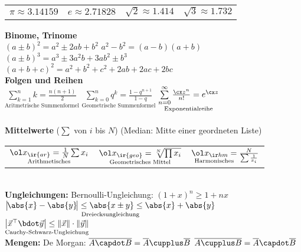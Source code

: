 \documentclass[english]{latex4ei_sheet}
\begin{document}
\begin{sectionbox}
	\begin{tabular}{@{}llll}
		$\pi \approx \num{3,14159}$ & $e \approx \num{2,71828}$ & $\sqrt{2} \approx \num{1,414}$ & $\sqrt{3} \approx \num{1,732}$ \\
	\end{tabular}
	
	\textbf{Binome, Trinome}\\
	$(a\pm b)^2 = a^2 \pm 2ab + b^2$ \hfill $a^2 - b^2 = (a-b)(a+b)$\\
	$(a \pm b)^3 = a^3 \pm 3a^2b + 3ab^2 \pm b^3$\\
	$(a+b+c)^2 = a^2 + b^2 + c^2 + 2ab + 2ac + 2bc$
	\\[0.5em]
	\textbf{Folgen und Reihen}\\
	$\underset{\text{Aritmetrische Summenformel}}{\sum \limits_{k=1}^{n} k = \frac{n (n+1)}{2}}$ \quad $\underset{\text{Geometrische Summenformel}}{\sum \limits_{k=0}^{n} q^k = \frac{1 - q^{n+1}}{1-q}}$ \quad $\underset{\text{Exponentialreihe}}{\sum\limits_{n = 0}^{\infty} \frac{\cx z^n}{n!} = e^{\cx z}}$\\
	\\[0.5em]
	\textbf{Mittelwerte} \quad ($\sum$ von $i$ bis $N$) \hfill {\small (Median: Mitte einer geordneten Liste)}\\
	\begin{tabular*}{\columnwidth}{@{\extracolsep\fill}l@{\quad\ $\ge$}l@{\quad\ $\ge$}l}
		$\underset{\text{Arithmetisches}}{\ol x_{\ir{ar}} = \frac{1}{N} \sum x_i}$ & $\underset{\text{Geometrisches Mittel}}{\ol x_{\ir{geo}} = \sqrt[N]{ \prod x_i }}$ & $\underset{\text{Harmonisches}}{\ol x_{\ir hm} = }\frac{N}{\sum \frac{1}{x_i}}$\\
	\end{tabular*}
	\\[0.5em]
	\textbf{Ungleichungen:} \hfill Bernoulli-Ungleichung:  $(1+x)^n \ge 1+nx$\\
	$\underset{\text{Dreiecksungleichung}}{\big|\! \abs{x}- \abs{y}\!\big| \le \abs{x \pm y} \le \abs{x} + \abs{y}}$ \hfill
	$\underset{\text{Cauchy-Schwarz-Ungleichung}}{\left| \vec x^\top \bdot \vec y \right| \le \| \vec x\| \cdot \| \vec y\|}$
	\\[0.5em]
	\textbf{Mengen:} De Morgan: $\overline{A \capdot B} = \overline{A} \cupplus \overline{B}$ \hfill $\overline{A \cupplus B} = \overline{A} \capdot \overline{B}$
\end{sectionbox}
\end{document}
